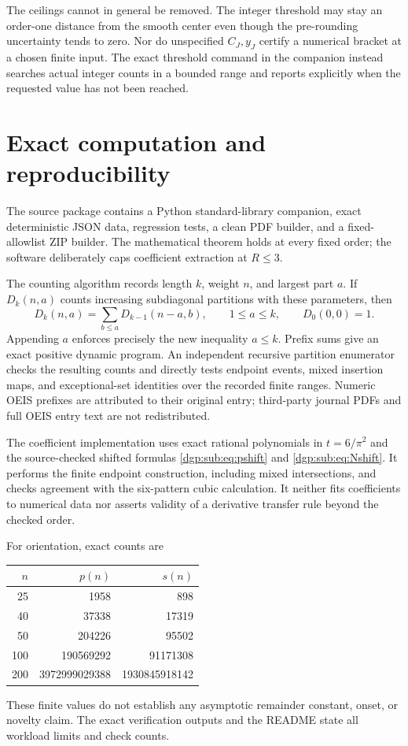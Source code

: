 \documentclass[11pt,letterpaper]{article}
\numberwithin{equation}{section}
\theoremstyle{remark}\newtheorem{remark}[theorem]{Remark}
\begin{document}
The ceilings cannot in general be removed. The integer threshold
may stay an order-one distance from the smooth center even though
the pre-rounding uncertainty tends to zero. Nor do unspecified
$C_J,y_J$ certify a numerical bracket at a chosen finite input.
The exact threshold command in the companion instead searches
actual integer counts in a bounded range and reports explicitly
when the requested value has not been reached.

\section{Exact computation and reproducibility}\label{dgp:sub:sec:compute}
The source package contains a Python standard-library companion,
exact deterministic JSON data, regression tests, a clean PDF
builder, and a fixed-allowlist ZIP builder. The mathematical theorem
holds at every fixed order; the software deliberately caps
coefficient extraction at $R\leq3$.

The counting algorithm records length $k$, weight $n$, and largest
part $a$. If $D_k(n,a)$ counts increasing subdiagonal partitions
with these parameters, then
\[
 D_k(n,a)=\sum_{b\leq a}D_{k-1}(n-a,b),\qquad 1\leq a\leq k,
 \qquad D_0(0,0)=1.
\]
Appending $a$ enforces precisely the new inequality $a\leq k$.
Prefix sums give an exact positive dynamic program. An independent
recursive partition enumerator checks the resulting counts and
directly tests endpoint events, mixed insertion maps, and
exceptional-set identities over the recorded finite ranges.
Numeric OEIS prefixes are attributed to their original entry;
third-party journal PDFs and full OEIS entry text are not
redistributed.

The coefficient implementation uses exact rational polynomials in
$t=6/\pi^2$ and the source-checked shifted formulas
\eqref{dgp:sub:eq:pshift} and \eqref{dgp:sub:eq:Nshift}. It performs the finite
endpoint construction, including mixed intersections, and checks
agreement with the six-pattern cubic calculation. It neither fits
coefficients to numerical data nor asserts validity of a derivative
transfer rule beyond the checked order.

For orientation, exact counts are
\begin{center}
\begin{tabular}{r r r}
\toprule
$n$ & $p(n)$ & $s(n)$\\
\midrule
25 & 1958 & 898\\
40 & 37338 & 17319\\
50 & 204226 & 95502\\
100 & 190569292 & 91171308\\
200 & 3972999029388 & 1930845918142\\
\bottomrule
\end{tabular}
\end{center}
These finite values do not establish any asymptotic remainder
constant, onset, or novelty claim. The exact verification outputs
and the README state all workload limits and check counts.
\end{document}
